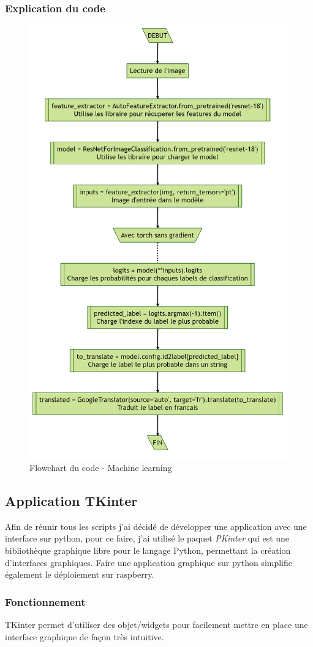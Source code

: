 \subsubsection{Explication du code}

\begin{figure}[h]
	\centering
	\includegraphics[width=0.483\linewidth]{../Flowcharts/output}
	\caption{Flowchart du code - Machine learning}
	\label{fig:output}
\end{figure}


\clearpage	
\subsection{Application TKinter}
Afin de réunir tous les scripts j'ai décidé de développer une application avec une interface sur python, pour ce faire, j'ai utilisé le paquet \textit{PKinter} qui est une  bibliothèque graphique libre pour le langage Python, permettant la création d'interfaces graphiques. Faire une application graphique sur python simplifie également le déploiement sur raspberry.

\subsubsection{Fonctionnement}
TKinter permet d'utiliser des objet/widgets pour facilement mettre en place une interface graphique de façon très intuitive.

